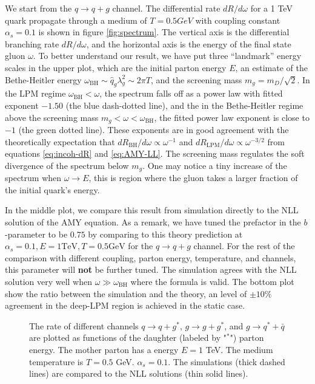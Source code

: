 We start from the $q\rightarrow q+g$ channel.
The differential rate $dR/d\omega$ for a 1 TeV quark propagate through a medium of $T=0.5 GeV$ with coupling constant $\alpha_s = 0.1$ is shown in 
figure \ref{fig:spectrum}.
The vertical axis is the differential branching rate $dR/d\omega$, and the horizontal axis is the energy of the final state gluon $\omega$.
To better understand our result, we have put three ``landmark'' energy scales in the upper plot, which are the initial parton energy $E$, an estimate of the Bethe-Heitler energy $\omega_{\textrm{BH}}\sim\hat{q}_g \lambda_g^2 \sim 2\pi T$, and the screening mass $m_g = m_D/\sqrt{2}$.
In the LPM regime $\omega_{\textrm{BH}} < \omega$, the spectrum falls off as a power law with fitted exponent $-1.50$ (the blue dash-dotted line), and the in the Bethe-Heitler regime above the screening mass $m_g < \omega < \omega_{\textrm{BH}}$, the fitted power law exponent is close to $-1$ (the green dotted line).
These exponents are in good agreement with the theoretically expectation that $dR_{\textrm{BH}}/d\omega \propto \omega^{-1}$ and $dR_{\textrm{LPM}}/d\omega \propto \omega^{-3/2}$ from equations \ref{eq:incoh-dR} and \ref{eq:AMY-LL}.
The screening mass regulates the soft divergence of the spectrum below $m_g$.
One may notice a tiny increase of the spectrum when $\omega \rightarrow E$, this is region where the gluon takes a larger fraction of the initial quark's energy.

In the middle plot, we compare this result from simulation directly to the NLL solution of the AMY equation. 
As a remark, we have tuned the prefactor in the $b$-parameter to be $0.75$  by comparing to this theory prediction at $\alpha_s=0.1, E=1 \textrm{TeV}, T = 0.5 \textrm{GeV}$ for the $q\rightarrow q+g$ channel.
For the rest of the comparison with different coupling, parton energy, temperature, and channels, this parameter will {\bf not} be further tuned.
The simulation agrees with the NLL solution very well when $\omega \gg \omega_{\textrm{BH}}$ where the formula is valid.
The bottom plot show the ratio between the simulation and the theory, an level of $\pm 10\%$ agreement in the deep-LPM region is achieved in the static case.

\begin{figure}
\caption{The rate of different channels $q\rightarrow q+g^*$, $g\rightarrow g+g^*$, and $g\rightarrow q^* + \bar{q}$ are plotted as functions of the daughter (labeled by "${}^*$") parton energy. The mother parton has a energy $E=1$ TeV. The medium temperature is $T=0.5$ GeV. $\alpha_s = 0.1$. The simulations (thick dashed lines) are compared to the NLL solutions (thin solid lines).}
\label{fig:channel_rate}
\end{figure}

